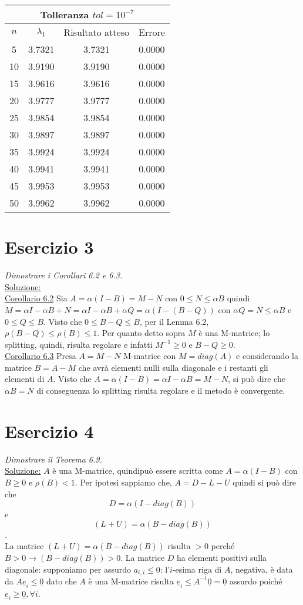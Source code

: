 \begin{center}\begin{tabular}{c|c|c|c}
\hline\multicolumn{4}{c}{Tolleranza $tol=10^{-7}$}\\\hline
$n$ & $\lambda_1$ & Risultato atteso & Errore\\\hline
5 & 3.7321 & 3.7321 & 0.0000 \\
10 & 3.9190 & 3.9190 & 0.0000 \\
15 & 3.9616 & 3.9616 & 0.0000 \\
20 & 3.9777 & 3.9777 & 0.0000 \\
25 & 3.9854 & 3.9854 & 0.0000 \\
30 & 3.9897 & 3.9897 & 0.0000 \\
35 & 3.9924 & 3.9924 & 0.0000 \\
40 & 3.9941 & 3.9941 & 0.0000 \\
45 & 3.9953 & 3.9953 & 0.0000 \\
50 & 3.9962 & 3.9962 & 0.0000
\end{tabular}\end{center}
\section{Esercizio 3}
\label{sub:es3}
\emph{Dimostrare i Corollari 6.2 e 6.3.}\\
\underline{Soluzione:}\\
\underline{Corollario 6.2}
Sia $A=\alpha(I-B)=M-N$ con $0\leq N\leq\alpha B$
quindi $M=\alpha I-\alpha B+N=\alpha I-\alpha B+\alpha Q=\alpha(I-(B-Q))$
con $\alpha Q=N\leq\alpha B$ e $0\leq Q\leq B$.
Visto che $0\leq B-Q\leq B$, per il Lemma 6.2, $\rho(B-Q)\leq\rho(B)\leq 1$.
Per quanto detto sopra $M$ è una M-matrice; lo splitting, quindi, risulta regolare e infatti $M^{-1}\geq 0$ e $B-Q\geq 0$.\\
\underline{Corollario 6.3}
Presa $A=M-N$ M-matrice con $M=diag(A)$ e considerando la matrice $B=A-M$ che avrà elementi nulli sulla diagonale e i restanti
gli elementi di $A$.
Visto che $A=\alpha(I-B)=\alpha I-\alpha B=M-N$, si può dire che $\alpha B=N$ di conseguenza lo splitting risulta regolare
e il metodo è convergente.
\section{Esercizio 4}
\label{sub:es4}
\emph{Dimostrare il Teorema 6.9.}\\
\underline{Soluzione:}
$A$ è una M-matrice, quindipuò essere scritta come $A=\alpha(I-B)$ con $B\geq 0$ e $\rho(B)<1$.
Per ipotesi sappiamo che, $A=D-L-U$
quindi si può dire che $$D=\alpha(I-diag(B))$$ e $$(L+U)=\alpha(B-diag(B))$$.\\
			La matrice $(L+U)=\alpha(B-diag(B))$ risulta  $>0$ perché $B>0\rightarrow (B-diag(B))>0$.
			La matrice $D$ ha elementi positivi sulla diagonale: supponiamo per assurdo $a_{i,i}\leq 0$: l'$i$-esima riga di $A$, negativa,
      è data da $A\underline{e}_i\leq\underline{0}$ dato che $A$ è una M-matrice risulta $\underline{e}_i\leq A^{-1}\underline{0}=\underline{0}$
       assurdo poiché $\underline{e}_i\geq\underline{0}, \forall i$.
